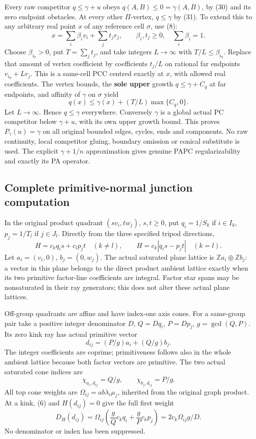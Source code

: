\documentclass[
  11pt,
]{article}
\begin{document}
Every raw competitor \(q\leq\gamma+u\) obeys
\(q(A,B)\leq0=\gamma(A,B)\), by (30) and its zero endpoint obstacles. At
every other \(\Pi\)-vertex, \(q\leq\gamma\) by (31). To extend this to
any arbitrary real point \(x\) of any reference cell \(\sigma\), use
(8): \[
 x=\sum_i\beta_iv_i+\sum_jt_jr_j,\qquad
 \beta_i,t_j\geq0,\quad\sum_i\beta_i=1.
\] Choose \(\beta_{i_0}>0\), put \(T=\sum_jt_j\), and take integers
\(L\to\infty\) with \(T/L\leq\beta_{i_0}\). Replace that amount of
vertex coefficient by coefficients \(t_j/L\) on rational far endpoints
\(v_{i_0}+Lr_j\). This is a same-cell PCC centred exactly at \(x\), with
allowed real coefficients. The vertex bounds, the \textbf{sole upper}
growth \(q\leq\gamma+C_q\) at far endpoints, and affinity of \(\gamma\)
on \(\sigma\) yield \[
                         q(x)\leq\gamma(x)+(T/L)\max\{C_q,0\}.
\] Let \(L\to\infty\). Hence \(q\leq\gamma\) everywhere. Conversely
\(\gamma\) is a global actual PC competitor below \(\gamma+u\), with its
own upper growth bound. This proves \(P_\gamma(u)=\gamma\) on all
original bounded edges, cycles, ends and components. No raw continuity,
local competitor gluing, boundary omission or conical substitute is
used. The explicit \(\gamma+1/n\) approximation gives genuine PAPC
regularizability and exactly its PA operator.

\subsection{Complete primitive-normal junction
computation}\label{complete-primitive-normal-junction-computation}

In the original product quadrant \((s v_i,t w_j)\), \(s,t\geq0\), put
\(q_i=1/S_k\) if \(i\in I_k\), \(p_j=1/T_l\) if \(j\in J_l\). Directly
from the three specified tripod directions, \[
 H=c_kq_i s+c_lp_j t\quad(k\ne l),\qquad
 H=c_k|q_i s-p_jt|\quad(k=l).                              \tag{32}
\] Let \(a_i=(v_i,0)\), \(b_j=(0,w_j)\). The actual saturated plane
lattice is \(\mathbb Za_i\oplus\mathbb Zb_j\): a vector in this plane
belongs to the direct product ambient lattice exactly when its two
primitive factor-line coefficients are integral. Factor star spans may
be nonsaturated in their ray generators; this does not alter these
actual plane lattices.

Off-group quadrants are affine and have index-one axis cones. For a
same-group pair take a positive integer denominator \(D\), \(Q=Dq_i\),
\(P=Dp_j\), \(g=\gcd(Q,P)\). Its zero kink ray has actual primitive
vector \[
                            d_{ij}=(P/g)a_i+(Q/g)b_j.        \tag{33}
\] The integer coefficients are coprime; primitiveness follows also in
the whole ambient lattice because both factor vectors are primitive. The
two actual saturated cone indices are \[
                    \chi_{a_i,d_{ij}}=Q/g,\qquad
                    \chi_{b_j,d_{ij}}=P/g.                 \tag{34}
\] All top cone weights are \(\Omega_{ij}=ab\lambda_i\mu_j\), inherited
from the original graph product. At a kink, (6) and \(H(d_{ij})=0\) give
the full first weight \[
 D_H(d_{ij})=\Omega_{ij}\left(\frac gQ c_kq_i+\frac gP c_kp_j\right)
                             =2c_k\Omega_{ij}g/D.           \tag{35}
\] No denominator or index has been suppressed.
\end{document}
